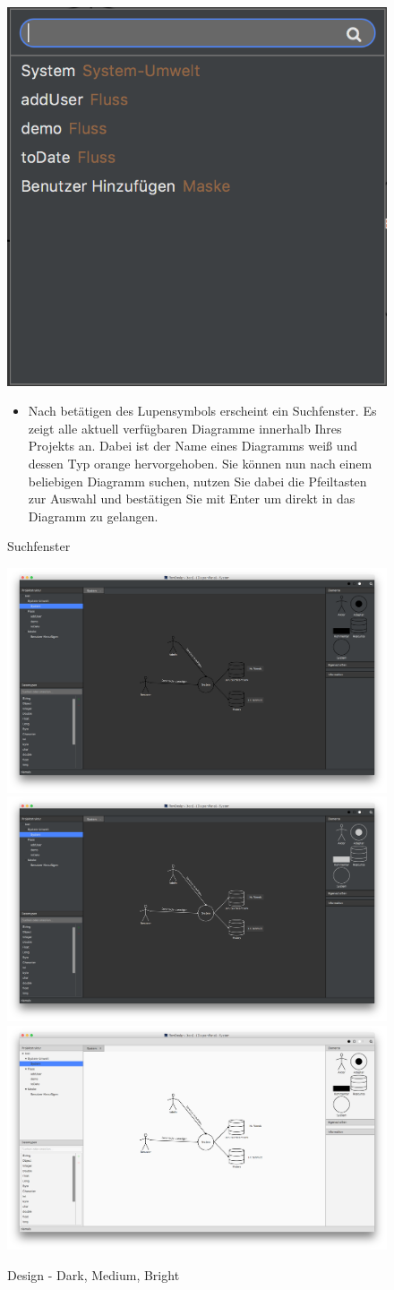 \begin{figure}[h!]
	\centering
	\includegraphics[width=.45\textwidth]{Search.png}
	\caption{Suchfenster}
\begin{itemize}	
\item Nach betätigen des Lupensymbols erscheint ein Suchfenster. Es zeigt alle aktuell verfügbaren Diagramme innerhalb Ihres Projekts an. Dabei ist der Name eines Diagramms weiß und dessen Typ orange hervorgehoben. Sie können nun nach einem beliebigen Diagramm suchen, nutzen Sie dabei die Pfeiltasten zur Auswahl und bestätigen Sie mit Enter um direkt in das Diagramm zu gelangen.
\end{itemize}
\end{figure}

\begin{figure}[h!]
	\centering
	\includegraphics[width=.45\textwidth]{Design_Dark.png}
	\includegraphics[width=.45\textwidth]{Design_Medium.png}
	\includegraphics[width=.45\textwidth]{Design_Bright.png}
	\caption{Design - Dark, Medium, Bright}
\end{figure}